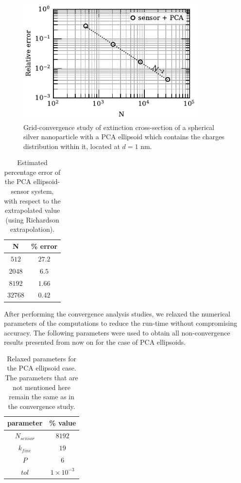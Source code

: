 \begin{figure}%
    \centering
    \includegraphics[width=0.85\textwidth]{convergence_sensor_pca_w380.pdf} 
    \caption{Grid-convergence study of extinction cross-section of a spherical silver
             nanoparticle with a PCA ellipsoid which contains 
             the charges distribution within it, located at $d=1$ nm.}
    \label{fig:err_sph-pca}
 \end{figure}

 \begin{table}%
    \centering
    \caption{\label{table:err_sph-pca} Estimated percentage error of the PCA ellipsoid-sensor 
    system, with respect to the extrapolated value (using Richardson extrapolation).} 
    \begin{tabular}{c c}
    \hline%
    N & \% error \\
    \hline%
     $512$ & $27.2$ \\
     $2048$ & $6.5$ \\
     $8192$ & $1.66$ \\
     $32768$ & $0.42$ \\
    \hline%
    \end{tabular}
\end{table}

After performing the convergence analysis studies, we relaxed the numerical parameters of the computations to reduce the run-time without 
compromising accuracy. The following parameters were used to obtain all non-convergence results presented from now on for the case of PCA ellipsoids.

\begin{table}%
    \centering
    \caption{\label{table:rel_pca_par} Relaxed parameters for the PCA ellipsoid case. The parameters that are not 
    mentioned here remain the same as in the convergence study.} 
    \begin{tabular}{c c}
    \hline%
    parameter & \% value \\
    \hline%
     $N_{sensor}$ & $8192$ \\
     $k_{fine}$ & $19$ \\
     $P$ & $6$ \\
     $tol$ & $1\times 10^{-3}$ \\
    \hline%
    \end{tabular}
\end{table}

